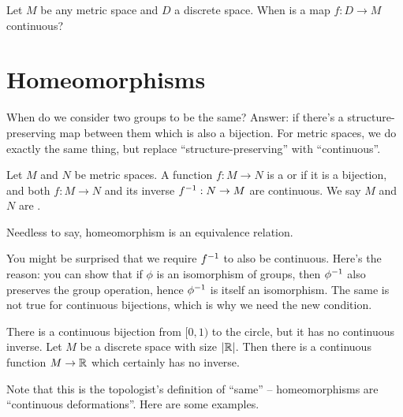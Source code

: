 \begin{ques}
	Let $M$ be any metric space and $D$ a discrete space.
	When is a map $f : D \to M$ continuous?
\end{ques}



\section{Homeomorphisms}
When do we consider two groups to be the same?
Answer: if there's a structure-preserving map between them which is also a bijection.
For metric spaces, we do exactly the same thing, but replace ``structure-preserving'' with ``continuous''.

\begin{definition}
	Let $M$ and $N$ be metric spaces.
	A function $f : M \to N$ is a
	 or  if it is a bijection,
	and both $f : M \to N$ and its inverse $f^{-1} : N \to M$ are continuous.
	We say $M$ and $N$ are .
\end{definition}
Needless to say, homeomorphism is an equivalence relation.

You might be surprised that we require $f^{-1}$ to also be continuous.
Here's the reason: you can show that if $\phi$ is
an isomorphism of groups, then $\phi^{-1}$ also preserves the group operation,
hence $\phi^{-1}$ is itself an isomorphism.
The same is not true for continuous bijections,
which is why we need the new condition.
\begin{example}
	\begin{enumerate}[(a)]
		\ii There is a continuous bijection from $[0,1)$ to the circle,
		but it has no continuous inverse.
		\ii Let $M$ be a discrete space with size $|\mathbb R|$.
		Then there is a continuous function $M \to \mathbb R$
		which certainly has no inverse.
	\end{enumerate}
\end{example}

Note that this is the topologist's definition of ``same'' --
homeomorphisms are ``continuous deformations''.
Here are some examples.

